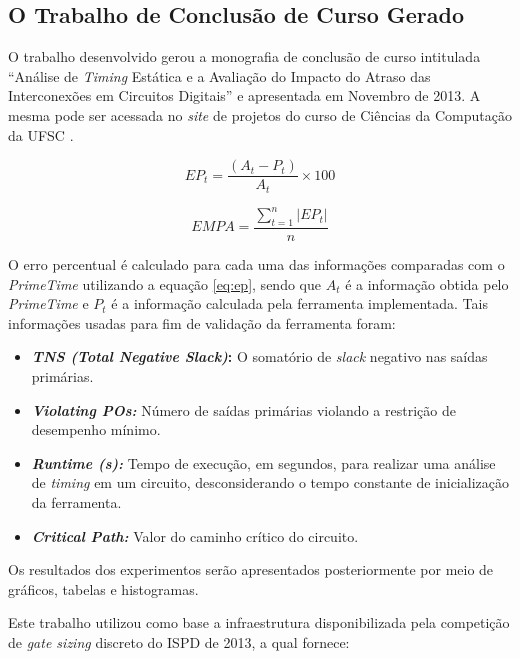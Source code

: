 \documentclass[
	12pt,				%
	openright,			%
	twoside,			%
	a4paper,			%
	english,			%
	french,				%
	spanish,			%
	brazil,				%
	]{abntex2}
\begin{document}
\subsection{O Trabalho de Conclusão de Curso Gerado}
\label{sec:tcc}
O trabalho desenvolvido gerou a monografia de conclusão de curso intitulada ``Análise de \textit{Timing} Estática e a Avaliação do Impacto do Atraso das Interconexões em Circuitos Digitais'' e apresentada em Novembro de 2013. A mesma pode ser acessada no \textit{site} de projetos do curso de Ciências da Computação da UFSC \cite{linkTCC}.

\begin{equation}
\label{eq:ep}
EP_t = \frac{(A_t - P_t)}{A_t} \times 100
\end{equation}

\begin{equation}
\label{eq:empa}
EMPA = \frac{\sum_{t=1}^n |EP_t|}{n}
\end{equation}

O erro percentual é calculado para cada uma das informações comparadas com o \textit{PrimeTime} utilizando a equação \ref{eq:ep}, sendo que $A_t$ é a informação obtida pelo \textit{PrimeTime} e $P_t$ é a informação calculada pela ferramenta implementada. Tais informações usadas para fim de validação da ferramenta foram:

\begin{itemize}
\item \textbf{\textit{TNS (Total Negative Slack)}: } O somatório de \textit{slack} negativo nas saídas primárias.

\item \textbf{\textit{Violating POs: }} Número de saídas primárias violando a restrição de desempenho mínimo.

\item \textbf{\textit{Runtime (s): }} Tempo de execução, em segundos, para realizar uma análise de \textit{timing} em um circuito, desconsiderando o tempo constante de inicialização da ferramenta.

\item \textbf{\textit{Critical Path: }} Valor do caminho crítico do circuito.
\end{itemize}

Os resultados dos experimentos serão apresentados posteriormente por meio de gráficos, tabelas e histogramas.

Este trabalho utilizou como base a infraestrutura disponibilizada pela competição de \textit{gate sizing} discreto do ISPD de 2013, a qual fornece:
\end{document}
